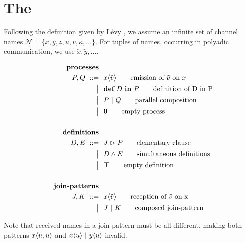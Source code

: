 \section{The \JoinCalc}



Following the definition given by Lévy \cite{levy_results_1997},
we assume an infinite set of channel names
$ \mathcal{N} = \{ x, y, z, u, v, \kappa, \ldots \} $.
For tuples of names, occurring in polyadic communication, we use
$ \tilde{x}, \tilde{y}, \ldots $.

\begin{align}
  \tag*{\textbf{processes}}
  \\
  P, Q
  \grmr \jsnd{x}{\tilde{v}}   \tag*{emission of $\tilde{v}$ on $x$}
  \altn \nonumber \jdef{D}{P} \tag*{definition of D in P}
  \altn P \jpar Q             \tag*{parallel composition}
  \altn \jnullproc            \tag*{empty process}
  \\ \nonumber
  \\
  \tag*{\textbf{definitions}}
  \\
  D, E
  \grmr \jrct{J}{P} \tag*{elementary clause}
  \altn D \jcon E   \tag*{simultaneous definitions}
  \altn \jnulldef   \tag*{empty definition}
  \\ \nonumber
  \\
  \tag*{\textbf{join-patterns}}
  \\
  J, K
  \grmr \jrcv{x}{\tilde{v}} \tag*{reception of $\tilde{v}$ on x}
  \altn J \jpat K           \tag*{composed join-pattern}
\end{align}

Note that received names in a join-pattern must be all different,
making both patterns
$ x\langle u,u\rangle $ and
$ x\langle u\rangle \ |\  y\langle u\rangle $
invalid.



